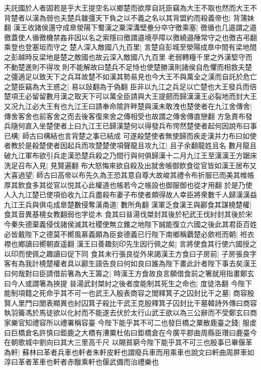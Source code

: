 夫託國於人者固若是乎大王提空名以鄉楚而欲厚自託臣竊為大王不取也然而大王不背楚者以漢為弱也夫楚兵雖彊天下負之以不義之名以其背盟約而殺義帝也|{
	背蒲妹翻}
漢王收諸侯還守成臯滎陽下蜀漢之粟深溝壁壘分卒守徼乘塞|{
	徼循也几邉謂之邉徼蓋使人循徼機禁姦非因以名之索隱曰徼謂邉境亭障以徼繞邉陲常守之也徼吉弔翻乘登也登塞垣而守之}
楚人深入敵國八九百里|{
	言楚自彭城至滎陽成臯中間有梁地間之彭越時反梁地是楚之敵國也故云深入敵國八九百里}
老弱轉糧千里之外漢堅守而不動楚進則不得攻則不能解故曰楚兵不足恃也使楚勝漢則諸侯自危懼而相救夫楚之彊適足以致天下之兵耳故楚不如漢其勢易見也今大王不與萬全之漢而自託於危亡之楚臣竊為大王惑之|{
	易以䜴翻為于偽翻}
臣非以九江之兵足以亡楚也大王發兵而倍楚項王必留留數月漢之取天下可以萬全臣請與大王提劒而歸漢漢王必裂地而封大王又况九江必大王有也九江王曰請奉命隂許畔楚與漢未敢洩也楚使者在九江舍傳舍|{
	傳舍客舍也前客舍之而去後客復來舍之傳相受也故謂之傳舍傳直戀翻}
方急責布發兵隨何直入坐楚使者上曰九江王已歸漢楚何以得發兵布愕然楚使者起何因說布曰事已構|{
	師古曰構結也言背楚之事已結成}
可遂殺楚使者無使歸而疾走漢并力布曰如使者教於是殺楚使者因起兵而攻楚楚使項聲龍且攻九江|{
	且子余翻龍姓且名}
數月龍且破九江軍布欲引兵走漢恐楚兵殺之乃間行與何俱歸漢十二月九江王至漢漢王方踞床洗足召布入見|{
	見賢遍翻}
布大怒悔來欲自殺及出就舍帳御飲食從官皆如漢王居布又大喜過望|{
	師古曰高帝以布先久為王恐其意自尊大故峻其禮令布折服已而美其帷帳厚其飲食多其從官以悦其心此權道也帳若今之帳設也御服御也從才用翻}
於是乃使人入九江楚已使項伯收九江兵盡殺布妻子布使者頗得故人幸臣將衆數千人歸漢漢益九江王兵與俱屯成臯楚數侵奪漢甬道|{
	數所角翻}
漢軍乏食漢王與酈食其謀橈楚權|{
	食其音異基橈女教翻弱也字從木}
食其曰㫺湯伐桀封其後於杞武王伐紂封其後於宋今秦失德棄義侵伐諸侯滅其社稷使無立錐之地陛下誠能復立六國之後此其君臣百姓必皆戴陛下之德莫不嚮風慕義願為臣妾德義已行陛下南鄉稱覇楚必歛袵而朝|{
	袵衣襟也鄉讀曰嚮朝直遥翻}
漢王曰善趣刻印先生因行佩之矣|{
	言將使食其行使六國授之以印而使佩之趣讀曰促下同}
食其未行張良從外來謁漢王方食曰子房前|{
	子房張良字}
客有為我計橈楚權者具以酈生語告良曰何如良曰誰為陛下畫此計者陛下事去矣漢王曰何哉對曰臣請借前箸為大王籌之|{
	時漢王方食故良言願借食前之箸就用指畫鄭玄曰今人或謂箸為挾提}
㫺湯武封桀紂之後者度能制其死生之命也|{
	度徒洛翻}
今陛下能制項籍之死命乎其不可一也武王入殷表商容之閭釋箕子之囚封比干之墓|{
	商容殷賢人里門曰閭表顯異也紂囚箕子殺比干武王克殷釋箕子囚封比干墓韓詩外傳曰商容執羽籥馮於馬徒欲以化紂而不能遂去伏於太行山武王欲以為三公辭而不受鄭玄曰商家樂官知禮容所以禮署稱容臺}
今陛下能乎其不可二也發巨橋之粟散鹿臺之錢|{
	服䖍曰巨橋倉名許慎曰鉅鹿之大橋有漕粟杜佑曰鉅橋倉在今廣平郡曲周縣臣瓚曰鹿臺今在朝歌城中劉向曰其大三里高千尺}
以賜貧窮今陛下能乎其不可三也殷事已畢偃革為軒|{
	蘇林曰革者兵車也軒者朱軒皮軒也謂廢兵車而用乘車也說文曰軒曲周屏車如淳曰革者革車也軒者赤黻乘軒也偃武備而治禮樂也}
